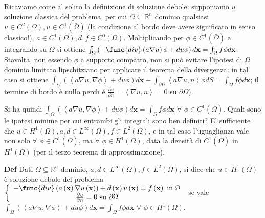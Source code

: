 \documentclass{article}
\begin{document}
Ricaviamo come al solito la definizione di soluzione debole: supponiamo $u$
soluzione classica del problema, per cui $\Omega \subseteq 
\mathbb{R}
^{n}$ dominio qualsiasi $u\in C^{2}\left( \Omega \right) ,u\in C^{1}\left( 
\bar{\Omega}\right) $ (la condizione al bordo deve avere significato in
senso classico!), $a\in C^{1}\left( \Omega \right) ,d,f\in C^{0}\left(
\Omega \right) $. Moltiplicando per $\phi \in C^{1}\left( \bar{\Omega}%
\right) $ e integrando su $%
\Omega $ si ottiene $\int_{\Omega }\left( -\func{div}\left( a\nabla u\right)
\phi +du\phi \right) d\mathbf{x}=\int_{\Omega }f\phi d\mathbf{x}$. Stavolta,
non essendo $\phi $ a supporto compatto, non si pu\`{o} evitare l'ipotesi di 
$\Omega $ dominio limitato lipschitziano per applicare il teorema della
divergenza: in tal caso si ottiene $\int_{\Omega }\left( \left\langle
a\nabla u,\nabla \phi \right\rangle +du\phi \right) d\mathbf{x-}%
\int_{\partial \Omega }\left\langle a\nabla u,n\right\rangle \phi
dS=\int_{\Omega }f\phi d\mathbf{x}$; il termine di bordo \`{e} nullo perch%
\'{e} $\frac{\partial u}{\partial n}=\left\langle \nabla u,n\right\rangle =0$
su $\partial \Omega $).

Si ha quindi $\int_{\Omega }\left( \left\langle a\nabla u,\nabla \phi
\right\rangle +du\phi \right) d\mathbf{x}=\int_{\Omega }f\phi d\mathbf{x}$ $%
\forall $ $\phi \in C^{1}\left( \bar{\Omega}\right) $. Quali sono le ipotesi
minime per cui entrambi gli integrali sono ben definiti? E' sufficiente che $%
u\in H^{1}\left( \Omega \right) ,a,d\in L^{\infty }\left( \Omega \right)
,f\in L^{2}\left( \Omega \right) $, e in tal caso l'uguaglianza vale non
solo $\forall $ $\phi \in C^{1}\left( \bar{\Omega}\right) $, ma $\forall $ $%
\phi \in H^{1}\left( \Omega \right) $, data la densit\`{a} di $C^{1}\left( 
\bar{\Omega}\right) $ in $H^{1}\left( \Omega \right) $ (per il terzo teorema
di approssimazione).

\textbf{Def} Dati $\Omega \subseteq 
\mathbb{R}
^{n}$ dominio, $a,d\in L^{\infty }\left( \Omega \right) ,f\in L^{2}\left(
\Omega \right) $, si dice che $u\in H^{1}\left( \Omega \right) $ \`{e}
soluzione debole del problema $\left\{ 
\begin{array}{c}
-\func{div}\left( a\left( \mathbf{x}\right) \nabla u\left( \mathbf{x}\right)
\right) +d\left( \mathbf{x}\right) u\left( \mathbf{x}\right) =f\left( 
\mathbf{x}\right) \text{ in }\Omega \\ 
\frac{\partial u}{\partial n}=0\text{ su }\partial \Omega%
\end{array}%
\right. $ se vale $\int_{\Omega }\left( \left\langle a\nabla u,\nabla \phi
\right\rangle +du\phi \right) d\mathbf{x}=\int_{\Omega }f\phi d\mathbf{x}$ $%
\forall $ $\phi \in H^{1}\left( \Omega \right) $.
\end{document}
